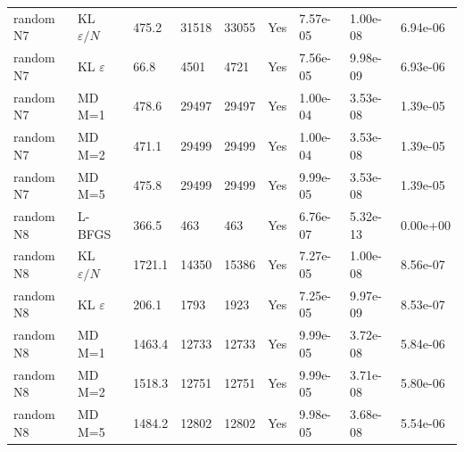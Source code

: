 \begin{table}
\begin{tabular}{lllllllll}
random N7 & KL $\varepsilon/N$ & 475.2 & 31518 & 33055 & Yes & 7.57e-05 & 1.00e-08 & 6.94e-06 \\
random N7 & KL $\varepsilon$ & 66.8 & 4501 & 4721 & Yes & 7.56e-05 & 9.98e-09 & 6.93e-06 \\
random N7 & MD M=1 & 478.6 & 29497 & 29497 & Yes & 1.00e-04 & 3.53e-08 & 1.39e-05 \\
random N7 & MD M=2 & 471.1 & 29499 & 29499 & Yes & 1.00e-04 & 3.53e-08 & 1.39e-05 \\
random N7 & MD M=5 & 475.8 & 29499 & 29499 & Yes & 9.99e-05 & 3.53e-08 & 1.39e-05 \\
random N8 & L-BFGS & 366.5 & 463 & 463 & Yes & 6.76e-07 & 5.32e-13 & 0.00e+00 \\
random N8 & KL $\varepsilon/N$ & 1721.1 & 14350 & 15386 & Yes & 7.27e-05 & 1.00e-08 & 8.56e-07 \\
random N8 & KL $\varepsilon$ & 206.1 & 1793 & 1923 & Yes & 7.25e-05 & 9.97e-09 & 8.53e-07 \\
random N8 & MD M=1 & 1463.4 & 12733 & 12733 & Yes & 9.99e-05 & 3.72e-08 & 5.84e-06 \\
random N8 & MD M=2 & 1518.3 & 12751 & 12751 & Yes & 9.99e-05 & 3.71e-08 & 5.80e-06 \\
random N8 & MD M=5 & 1484.2 & 12802 & 12802 & Yes & 9.98e-05 & 3.68e-08 & 5.54e-06 \\
\bottomrule
\end{tabular}
\end{table}
